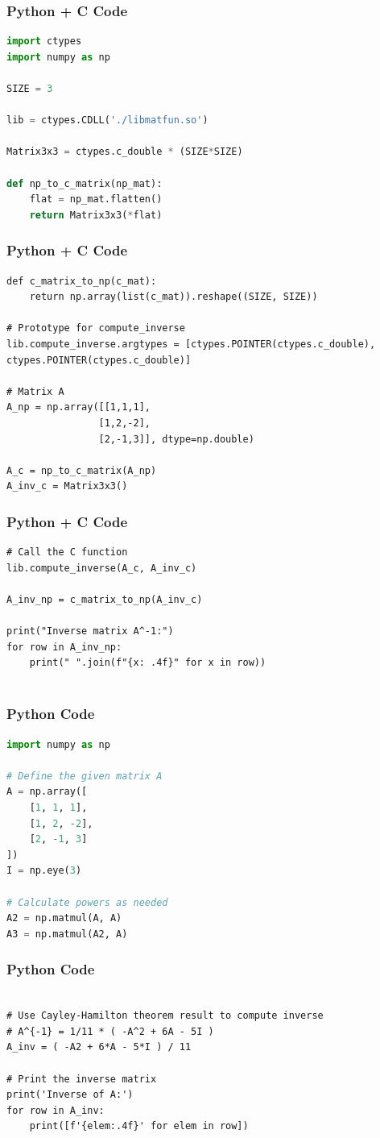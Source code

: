 \documentclass{beamer}
\numberwithin{equation}{section}
\begin{document}
\begin{frame}[fragile]
\frametitle{Python + C Code }
\begin{lstlisting}[language=Python]
import ctypes
import numpy as np

SIZE = 3

lib = ctypes.CDLL('./libmatfun.so')

Matrix3x3 = ctypes.c_double * (SIZE*SIZE)

def np_to_c_matrix(np_mat):
    flat = np_mat.flatten()
    return Matrix3x3(*flat)
\end{lstlisting}

\end{frame}
\begin{frame}[fragile]
    \frametitle{Python + C Code}
    \begin{lstlisting}
def c_matrix_to_np(c_mat):
    return np.array(list(c_mat)).reshape((SIZE, SIZE))

# Prototype for compute_inverse
lib.compute_inverse.argtypes = [ctypes.POINTER(ctypes.c_double), ctypes.POINTER(ctypes.c_double)]

# Matrix A
A_np = np.array([[1,1,1],
                [1,2,-2],
                [2,-1,3]], dtype=np.double)

A_c = np_to_c_matrix(A_np)
A_inv_c = Matrix3x3()
\end{lstlisting}
\end{frame}

\begin{frame}[fragile]
    \frametitle{Python + C Code }
    \begin{lstlisting}
# Call the C function
lib.compute_inverse(A_c, A_inv_c)

A_inv_np = c_matrix_to_np(A_inv_c)

print("Inverse matrix A^-1:")
for row in A_inv_np:
    print(" ".join(f"{x: .4f}" for x in row))


\end{lstlisting}
\end{frame}
\begin{frame}[fragile]
\frametitle{Python Code }
\begin{lstlisting}[language=Python]
import numpy as np

# Define the given matrix A
A = np.array([
    [1, 1, 1],
    [1, 2, -2],
    [2, -1, 3]
])
I = np.eye(3)

# Calculate powers as needed
A2 = np.matmul(A, A)
A3 = np.matmul(A2, A)
\end{lstlisting}

\end{frame}
\begin{frame}[fragile]
    \frametitle{Python Code}
    \begin{lstlisting}

# Use Cayley-Hamilton theorem result to compute inverse
# A^{-1} = 1/11 * ( -A^2 + 6A - 5I )
A_inv = ( -A2 + 6*A - 5*I ) / 11

# Print the inverse matrix
print('Inverse of A:')
for row in A_inv:
    print([f'{elem:.4f}' for elem in row])

\end{lstlisting}
\end{frame}
\end{document}
